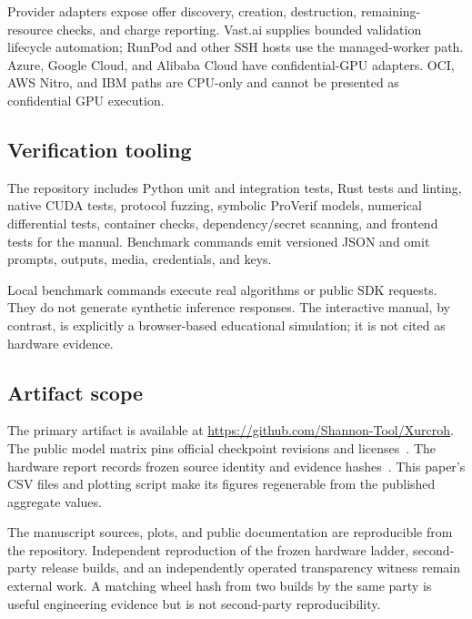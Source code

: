 Provider adapters expose offer discovery, creation, destruction, remaining-resource checks, and charge reporting. Vast.ai supplies bounded validation lifecycle automation; RunPod and other SSH hosts use the managed-worker path. Azure, Google Cloud, and Alibaba Cloud have confidential-GPU adapters. OCI, AWS Nitro, and IBM paths are CPU-only and cannot be presented as confidential GPU execution.

\subsection{Verification tooling}

The repository includes Python unit and integration tests, Rust tests and linting, native CUDA tests, protocol fuzzing, symbolic ProVerif models, numerical differential tests, container checks, dependency/secret scanning, and frontend tests for the manual. Benchmark commands emit versioned JSON and omit prompts, outputs, media, credentials, and keys.

Local benchmark commands execute real algorithms or public SDK requests. They do not generate synthetic inference responses. The interactive manual, by contrast, is explicitly a browser-based educational simulation; it is not cited as hardware evidence.

\subsection{Artifact scope}

The primary artifact is available at \url{https://github.com/Shannon-Tool/Xurcroh}. The public model matrix pins official checkpoint revisions and licenses~\cite{xurcroh-models}. The hardware report records frozen source identity and evidence hashes~\cite{xurcroh-validation}. This paper's CSV files and plotting script make its figures regenerable from the published aggregate values.

\begin{evidencebox}
The manuscript sources, plots, and public documentation are reproducible from the repository. Independent reproduction of the frozen hardware ladder, second-party release builds, and an independently operated transparency witness remain external work. A matching wheel hash from two builds by the same party is useful engineering evidence but is not second-party reproducibility.
\end{evidencebox}
